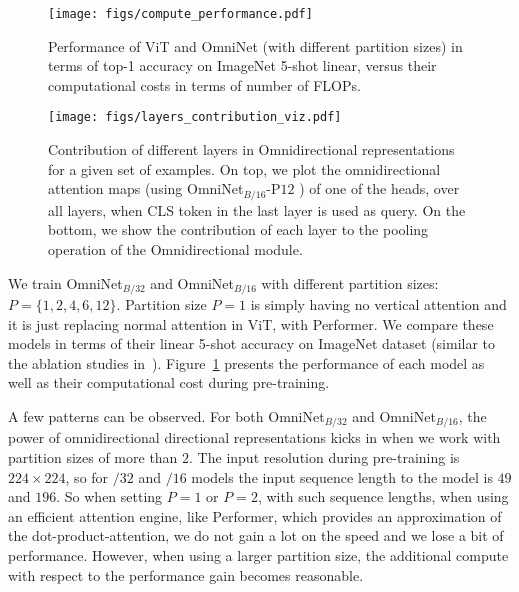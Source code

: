 \documentclass{article}
\begin{document}
\begin{figure}[t!]
\vspace{-11pt}
\begin{center}
\texttt{[image: figs/compute\_performance.pdf]}
\end{center}
\vspace{-15pt}
\caption{Performance of ViT and OmniNet (with different partition sizes) in terms of top-1 accuracy on ImageNet 5-shot linear, versus their computational costs in terms of number of FLOPs.}
\label{fig:OmniNet-ViT-ablation}
\vspace{-21pt}
\end{figure}

\begin{figure*}
    \centering
    \vspace{-5pt}
    \texttt{[image: figs/layers\_contribution\_viz.pdf]}
    \vspace{-23pt}
    \caption{Contribution of different layers in Omnidirectional representations for a given set of examples. On top, we plot the omnidirectional attention maps (using OmniNet$_{B/16}$-P$12$ ) of one of the heads, over all layers, when CLS token in the last layer is used as query. On the bottom, we show the contribution of each layer to the pooling operation of the Omnidirectional module.}
    \label{fig:layer_contributions_viz}
    \vspace{-15pt}
\end{figure*}

We train OmniNet$_{B/32}$ and OmniNet$_{B/16}$ with different partition sizes: $P=\{1, 2, 4, 6, 12\}$. Partition size $P=1$ is simply having no vertical attention and it is just replacing normal attention in ViT, with Performer. We compare these models in terms of their linear 5-shot accuracy on ImageNet dataset (similar to the ablation studies in~\citep{dosovitskiy2020image}). Figure~\ref{fig:OmniNet-ViT-ablation} presents the performance of each model as well as their computational cost during pre-training. 


A few patterns can be observed. For both OmniNet$_{B/32}$ and OmniNet$_{B/16}$, the power of omnidirectional directional representations kicks in when we work with partition sizes of more than $2$.  The input resolution during pre-training is $224\times224$, so for $/32$ and $/16$ models the input sequence length to the model is $49$ and $196$. So when setting $P=1$ or $P=2$,  with such sequence lengths, when using an efficient attention engine, like Performer, which provides an approximation of the dot-product-attention, we do not gain a lot on the speed and we lose a bit of performance. However, when using a larger partition size, the additional compute with respect to the performance gain becomes reasonable. 
\end{document}
